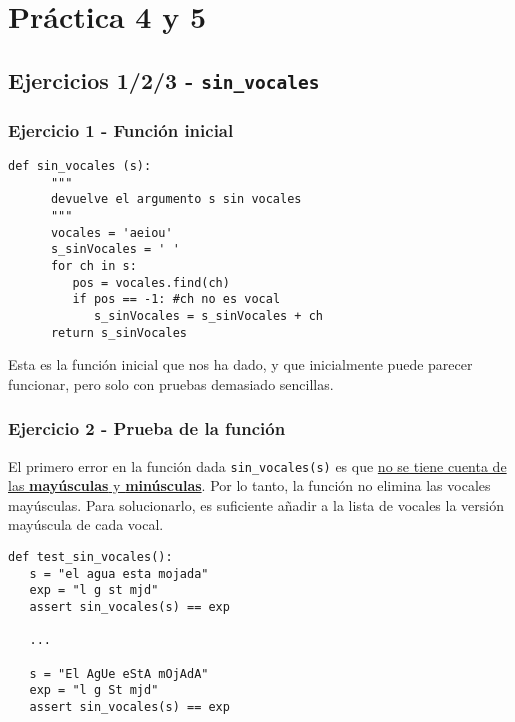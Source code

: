\chapter{Práctica 4 y 5}

\lstset{language=python}


\section{Ejercicios 1/2/3 - \texttt{sin\_vocales}}

\subsection{Ejercicio 1 - Función inicial}
\begin{lstlisting}[captionpos=b,caption={Función inicial}]
   def sin_vocales (s):
      """
      devuelve el argumento s sin vocales
      """
      vocales = 'aeiou'
      s_sinVocales = ' '
      for ch in s:
         pos = vocales.find(ch)
         if pos == -1: #ch no es vocal
            s_sinVocales = s_sinVocales + ch
      return s_sinVocales
\end{lstlisting}

Esta es la función inicial que nos ha dado, y que inicialmente puede parecer funcionar, pero solo con pruebas demasiado sencillas.

\subsection{Ejercicio 2 - Prueba de la función}



\begin{paracol}{2}
   \colfill
   El primero error en la función dada \lstinline{sin_vocales(s)} es que \ul{no se tiene cuenta de las \textbf{mayúsculas} y \textbf{minúsculas}}. Por lo tanto, la función no elimina las vocales mayúsculas. Para solucionarlo, es suficiente añadir a la lista de vocales la versión mayúscula de cada vocal.
   \colfill

   \switchcolumn

   \begin{lstlisting}
def test_sin_vocales():
   s = "el agua esta mojada"
   exp = "l g st mjd"
   assert sin_vocales(s) == exp

   ...
      
   s = "El AgUe eStA mOjAdA"
   exp = "l g St mjd"
   assert sin_vocales(s) == exp
   \end{lstlisting}
\end{paracol}

